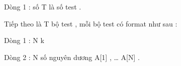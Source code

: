 Dòng 1 : số T là số test .   


   Tiếp theo là T bộ test , mỗi bộ test có format như sau :   


   Dòng 1 : N k   


   Dòng 2 : N số nguyên dương A[1] , … A[N] .